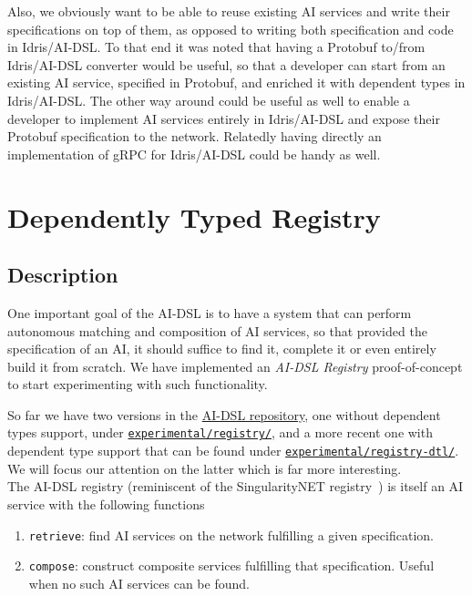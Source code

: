 \documentclass[]{report}
\begin{document}
Also, we obviously want to be able to reuse existing AI services and
write their specifications on top of them, as opposed to writing both
specification and code in Idris/AI-DSL.  To that end it was noted that
having a Protobuf to/from Idris/AI-DSL converter would be useful, so
that a developer can start from an existing AI service, specified in
Protobuf, and enriched it with dependent types in Idris/AI-DSL.  The
other way around could be useful as well to enable a developer to
implement AI services entirely in Idris/AI-DSL and expose their
Protobuf specification to the network.  Relatedly having directly an
implementation of gRPC for Idris/AI-DSL could be handy as well.

\section{Dependently Typed Registry}
\label{sec:dependently_typed_registry}

\subsection{Description}

One important goal of the AI-DSL is to have a system that can perform
autonomous matching and composition of AI services, so that provided
the specification of an AI, it should suffice to find it, complete it
or even entirely build it from scratch.  We have implemented an
\emph{AI-DSL Registry} proof-of-concept to start experimenting with
such functionality.

So far we have two versions in the
\href{https://github.com/singnet/ai-dsl/}{AI-DSL repository}, one
without dependent types support, under
\href{https://github.com/singnet/ai-dsl/blob/master/experimental/registry/}{\texttt{experimental/registry/}},
and a more recent one with dependent type support that can be found
under
\href{https://github.com/singnet/ai-dsl/blob/master/experimental/registry-dtl/}{\texttt{experimental/registry-dtl/}}.
We will focus our attention on the latter which is far more
interesting.\\

The AI-DSL registry (reminiscent of the SingularityNET
registry~\cite{SNETRegistry}) is itself an AI service with the following functions
\begin{enumerate}
\item \texttt{retrieve}: find AI services on the network fulfilling a
  given specification.
\item \texttt{compose}: construct composite services fulfilling that
  specification.  Useful when no such AI services can be found.
\end{enumerate}
\end{document}
